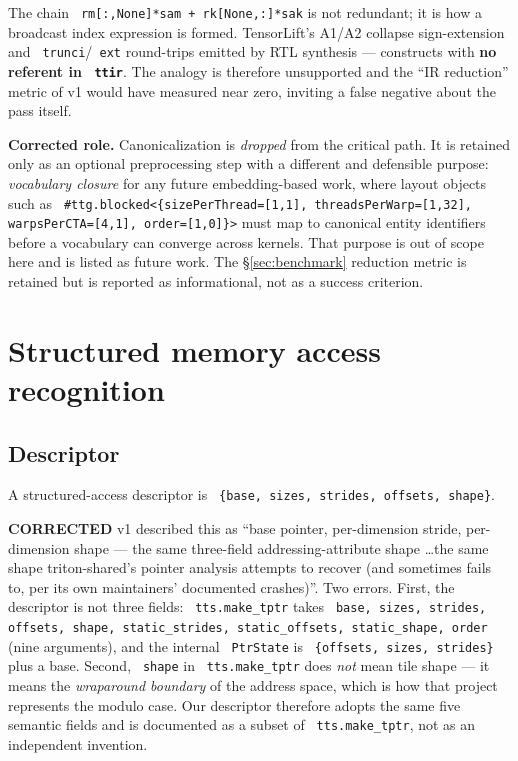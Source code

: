 \documentclass[11pt,a4paper]{article}
\newcommand{\code}[1]{\texttt{\small\hyphenchar\font=45 #1}}
\newcommand{\falsified}{\textbf{\textcolor{red!75!black}{CORRECTED}}}
\begin{document}
\noindent The chain \code{rm[:,None]*sam + rk[None,:]*sak} is not redundant; it is how a broadcast index
expression is formed. TensorLift's A1/A2 collapse sign-extension and \code{trunci}/\code{ext} round-trips
emitted by RTL synthesis --- constructs with \textbf{no referent in \code{ttir}}. The analogy is therefore
unsupported and the ``IR reduction'' metric of v1 would have measured near zero, inviting a false negative
about the pass itself.

\noindent\textbf{Corrected role.} Canonicalization is \emph{dropped} from the critical path. It is retained
only as an optional preprocessing step with a different and defensible purpose: \emph{vocabulary closure} for
any future embedding-based work, where layout objects such as
\code{\#ttg.blocked<\{sizePerThread=[1,1], threadsPerWarp=[1,32], warpsPerCTA=[4,1], order=[1,0]\}>} must map
to canonical entity identifiers before a vocabulary can converge across kernels. That purpose is out of
scope here and is listed as future work. The \S\ref{sec:benchmark} reduction metric is retained but is
reported as informational, not as a success criterion.

\section{Structured memory access recognition}\label{sec:recognition}

\subsection{Descriptor}

A structured-access descriptor is \code{\{base, sizes, strides, offsets, shape\}}.

\noindent\falsified{} v1 described this as ``base pointer, per-dimension stride, per-dimension shape --- the
same three-field addressing-attribute shape \ldots the same shape triton-shared's pointer analysis attempts
to recover (and sometimes fails to, per its own maintainers' documented crashes)''. Two errors. First, the
descriptor is not three fields: \code{tts.make\_tptr} takes \code{base, sizes, strides, offsets, shape,
static\_strides, static\_offsets, static\_shape, order} (nine arguments), and the internal \code{PtrState} is
\code{\{offsets, sizes, strides\}} plus a base. Second, \code{shape} in \code{tts.make\_tptr} does \emph{not}
mean tile shape --- it means the \emph{wraparound boundary} of the address space, which is how that project
represents the modulo case. Our descriptor therefore adopts the same five semantic fields and is documented
as a subset of \code{tts.make\_tptr}, not as an independent invention.
\end{document}
